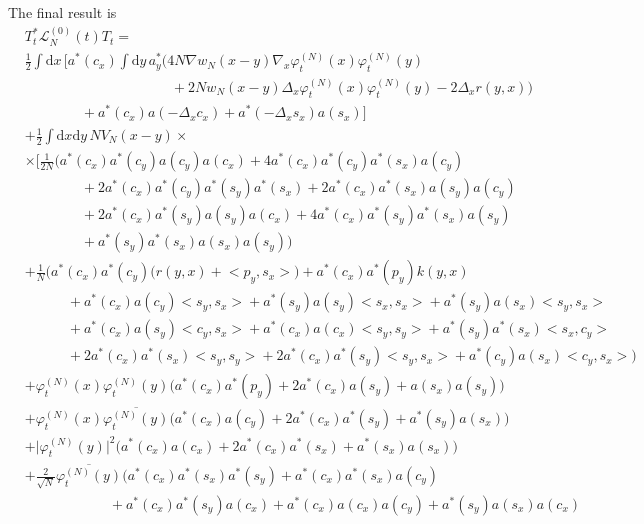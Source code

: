 \documentclass[11pt,a4paper,draft,DIV11]{scrartcl}	%
\newcommand{\di}{\textrm{d}}		%
\newcommand{\Lcal}{\mathcal{L}}		%
\newcommand{\scal}[2]{\big<#1,#2\big>} %
\newcommand{\cc}[1]{\overline{#1}}	%
\newcommand{\ph}{\varphi_t^{(N)}}	%
\begin{document}
The final result is
\begin{align}
& T^*_t \Lcal_N^{(0)}(t) T_t = \nonumber \\ 
& \frac{1}{2} \int \di x\, \bigg[ a^*(c_x) \int \di y\, a^*_y \Big(4 N \nabla w_N(x-y) \nabla_x \ph(x) \ph(y) \label{l7}\\
& \qquad\qquad \qquad\qquad \qquad \ \	+ 2Nw_N(x-y) \Delta_x \ph(x) \ph(y) - 2\Delta_x r(y,x) \Big) \label{l8}\\
& \qquad\qquad 			+ a^*(c_x) a(-\Delta_x c_x) + a^*(-\Delta_x s_x) a(s_x) \bigg] \label{l9} \\
& + \frac{1}{2}\int \di x \di y\, NV_N(x-y) \times \nonumber \\
& \times \Big[   \frac{1}{2N}\bigg( a^*(c_x) a^*(c_y) a(c_y) a(c_x) + 4 a^*(c_x) a^*(c_y) a^*(s_x) a(c_y) \label{l10}\\
				      & \qquad\qquad + 2 a^*(c_x) a^*(c_y) a^*(s_y) a^*(s_x) + 2 a^*(c_x) a^*(s_x) a(s_y) a(c_y) \label{l11}\\
				      & \qquad\qquad + 2 a^*(c_x) a^*(s_y) a(s_y) a(c_x) + 4 a^*(c_x) a^*(s_y) a^*(s_x) a(s_y) \label{l12}\\
				      & \qquad\qquad + a^*(s_y) a^*(s_x) a(s_x) a(s_y) \bigg) \label{l13}\\
& + \frac{1}{N}\bigg(   a^*(c_x) a^*(c_y) \Big( r(y,x) + \scal{p_y}{s_x} \Big) + a^*(c_x) a^*(p_y) k(y,x) \label{l14} \\
      & \qquad\quad + a^*(c_x) a(c_y) \scal{s_y}{s_x} + a^*(s_y) a(s_y) \scal{s_x}{s_x} + a^*(s_y) a(s_x) \scal{s_y}{s_x} \label{l15}\\
      & \qquad\quad + a^*(c_x) a(s_y) \scal{c_y}{s_x} + a^*(c_x) a(c_x) \scal{s_y}{s_y} + a^*(s_y) a^*(s_x) \scal{s_x}{c_y} \label{l16}\\
      & \qquad\quad + 2a^*(c_x) a^*(s_x) \scal{s_y}{s_y} + 2a^*(c_x)a^*(s_y) \scal{s_y}{s_x} + a^*(c_y) a(s_x) \scal{c_y}{s_x}    \bigg) \label{l17}\\
& + \ph(x)\ph(y) \Big( a^*(c_x) a^*(p_y) + 2 a^*(c_x) a(s_y) +a(s_x) a(s_y) \Big) \label{l18}\\
& + \ph(x) \cc{\ph(y)} \Big( a^*(c_x) a(c_y) + 2 a^*(c_x) a^*(s_y) + a^*(s_y) a(s_x) \Big) \label{l19}\\
& + \lvert \ph(y) \rvert^2 \Big( a^*(c_x) a(c_x) + 2 a^*(c_x) a^*(s_x) + a^*(s_x) a(s_x) \Big) \label{l20}\\
& + \frac{2}{\sqrt{N}}\cc{\ph(y)} \bigg(    a^*(c_x) a^*(s_x) a^*(s_y) + a^*(c_x) a^*(s_x) a(c_y) \label{l21}\\
					    & \qquad\qquad\qquad + a^*(c_x) a^*(s_y) a(c_x) + a^*(c_x) a(c_x) a(c_y) + a^*(s_y) a(s_x) a(c_x) \label{l22}\\

\end{align}
\end{document}
